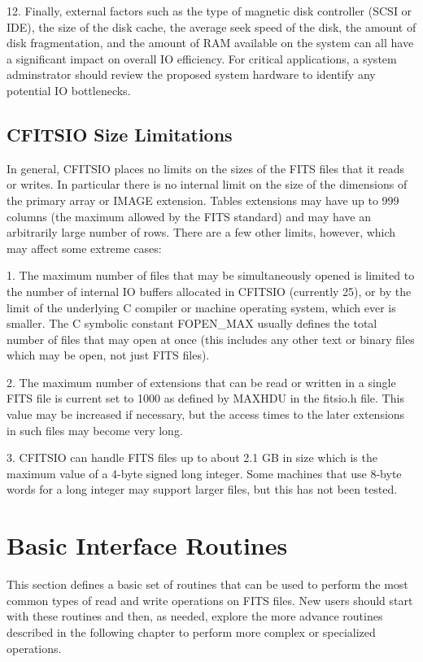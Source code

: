12.  Finally, external factors such as the type of magnetic disk
controller (SCSI or IDE), the size of the disk cache, the average seek
speed of the disk, the amount of disk fragmentation, and the amount of
RAM available on the system can all have a significant impact on
overall IO efficiency.  For critical applications, a system
adminstrator should review the proposed system hardware to identify any
potential IO bottlenecks.


\section{CFITSIO Size Limitations}

In general, CFITSIO places no limits on the sizes of the FITS files that
it reads or writes. In particular there is no internal limit on the size of the
dimensions of the primary array or IMAGE extension. Tables extensions may have
up to 999 columns (the maximum allowed by the FITS standard) and
may have an arbitrarily large number of rows. There are a few other limits,
however, which may affect some extreme cases:

1.  The maximum number of files that may be simultaneously opened is limited
to the number of internal IO buffers allocated in CFITSIO (currently 25),
or by the limit of the underlying C compiler or machine operating system, which
ever is smaller.
The C symbolic constant FOPEN\_MAX usually defines the total number of
files that may open at once (this includes any other text or binary
files which may be open, not just FITS files).

2.  The maximum number of extensions that can be read or written in a
single FITS file is current set to 1000 as defined by MAXHDU in the
fitsio.h file.  This value may be increased if necessary, but the
access times to the later extensions in such files may become very
long.

3.  CFITSIO can handle FITS files up to about 2.1 GB in size which is
the maximum value of a 4-byte signed long integer.  Some machines that use
8-byte words for a long integer may support larger files, but this has
not been tested.

\chapter{ Basic Interface Routines }

This section defines a basic set of routines that can be
used to perform the most common types of read and write operations
on FITS files.  New users should start with these routines and
then, as needed, explore the more advance routines described in
the following chapter to perform more complex or specialized operations.


